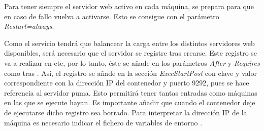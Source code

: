 Para tener siempre el servidor web  activo en cada máquina, se prepara para que en caso de fallo vuelva a activarse. Esto se consigue con el parámetro \textit{Restart=always}.

Como el servicio  tendrá que balancear la carga entre los distintos servidores web disponibles, será necesario que el servidor  se registre tras crearse. Este registro se va a realizar en etc, por lo tanto, éste se añade en los parámetros \textit{After} y \textit{Requires} como  tras . Así, el registro se añade en la sección \textit{ExecStartPost} con clave  y valor correspondiente con la dirección IP del contenedor y puerto 9292, pues se hace referencia al servidor puma. Esto permitirá tener tantas entradas  como máquinas en las que se ejecute hayan. Es importante añadir que cuando el contenedor deje de ejecutarse dicho registro sea borrado. Para interpretar la dirección IP de la máquina es necesario indicar el fichero de variables de entorno . 

